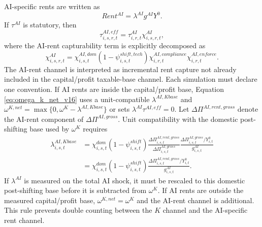 \documentclass[11pt,a4paper]{article}
\begin{document}
AI-specific rents are written as
\begin{equation}
    Rent^{AI}=\lambda^{AI}g^{AI}Y^0.
\end{equation}
If $\tau^{AI}$ is statutory, then
\begin{equation}\label{eq:ai_eff_decomp_v21}
    \tau^{AI,eff}_{i,s,r,t}=\tau^{AI}_{i,r,t}\chi^{AI}_{i,s,r,t},
\end{equation}
where the AI-rent capturability term is explicitly decomposed as
\begin{equation}\label{eq:chi_ai_decomp_v21}
    \chi^{AI}_{i,s,r,t}
    =\chi^{AI,dom}_{i,s,t}(1-\psi^{shift,tech}_{i,s,t})
    \chi^{AI,compliance}_{i,r,t}\chi^{AI,enforce}_{i,r,t}.
\end{equation}
The AI-rent channel is interpreted as incremental rent capture not already included in the capital/profit taxable-base channel. Each simulation must declare one convention. If AI rents are inside the capital/profit base, Equation \eqref{eq:omega_k_net_v16} uses a unit-compatible $\lambda^{AI,Kbase}$ and $\omega^{K,net}=\max\{0,\omega^K-\lambda^{AI,Kbase}\}$ or sets $\lambda^{AI}\tau^{AI,eff}=0$. Let $\Delta\Pi^{AI,rent,gross}$ denote the AI-rent component of $\Delta\Pi^{AI,gross}$. Unit compatibility with the domestic post-shifting base used by $\omega^K$ requires
\begin{equation}
\begin{split}
    \lambda^{AI,Kbase}_{i,s,t}
    &=\chi^{dom}_{i,s,t}(1-\psi^{shift}_{i,s,t})
    \frac{\Delta\Pi^{AI,rent,gross}_{i,s,t}}{\Delta\Pi^{AI,gross}_{i,s,t}}
    \frac{\Delta\Pi^{AI,gross}_{i,s,t}/Y^0_{i,t}}{g^{AI}_{i,s,t}}\\
    &=\chi^{dom}_{i,s,t}(1-\psi^{shift}_{i,s,t})
    \frac{\Delta\Pi^{AI,rent,gross}_{i,s,t}/Y^0_{i,t}}{g^{AI}_{i,s,t}}.
\end{split}
\end{equation}
If $\lambda^{AI}$ is measured on the total AI shock, it must be rescaled to this domestic post-shifting base before it is subtracted from $\omega^K$. If AI rents are outside the measured capital/profit base, $\omega^{K,net}=\omega^K$ and the AI-rent channel is additional. This rule prevents double counting between the $K$ channel and the AI-specific rent channel.
\end{document}
